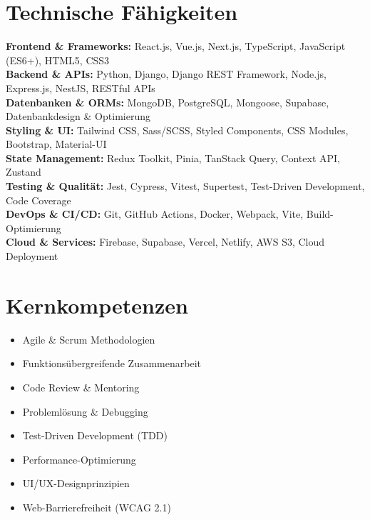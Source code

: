\documentclass[10pt,a4paper]{article}
\begin{document}
\section*{Technische Fähigkeiten}

\noindent
\textbf{\color{darkgray}Frontend \& Frameworks:} React.js, Vue.js, Next.js, TypeScript, JavaScript (ES6+), HTML5, CSS3 \\
\textbf{\color{darkgray}Backend \& APIs:} Python, Django, Django REST Framework, Node.js, Express.js, NestJS, RESTful APIs \\
\textbf{\color{darkgray}Datenbanken \& ORMs:} MongoDB, PostgreSQL, Mongoose, Supabase, Datenbankdesign \& Optimierung \\
\textbf{\color{darkgray}Styling \& UI:} Tailwind CSS, Sass/SCSS, Styled Components, CSS Modules, Bootstrap, Material-UI \\
\textbf{\color{darkgray}State Management:} Redux Toolkit, Pinia, TanStack Query, Context API, Zustand \\
\textbf{\color{darkgray}Testing \& Qualität:} Jest, Cypress, Vitest, Supertest, Test-Driven Development, Code Coverage \\
\textbf{\color{darkgray}DevOps \& CI/CD:} Git, GitHub Actions, Docker, Webpack, Vite, Build-Optimierung \\
\textbf{\color{darkgray}Cloud \& Services:} Firebase, Supabase, Vercel, Netlify, AWS S3, Cloud Deployment

\section*{Kernkompetenzen}

\noindent
\begin{minipage}[t]{0.48\textwidth}
  \begin{itemize}
    \item Agile \& Scrum Methodologien
    \item Funktionsübergreifende Zusammenarbeit
    \item Code Review \& Mentoring
    \item Problemlösung \& Debugging
  \end{itemize}
\end{minipage}%
\hfill
\begin{minipage}[t]{0.48\textwidth}
  \begin{itemize}
    \item Test-Driven Development (TDD)
    \item Performance-Optimierung
    \item UI/UX-Designprinzipien
    \item Web-Barrierefreiheit (WCAG 2.1)
  \end{itemize}
\end{minipage}
\end{document}

